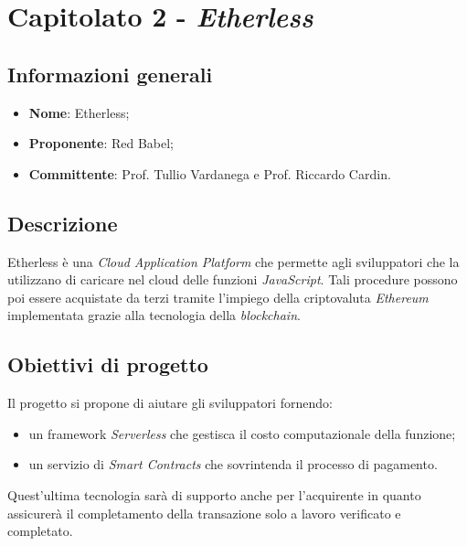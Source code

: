 \section{Capitolato 2 - \textit{Etherless}}
\subsection{Informazioni generali}
    \begin{itemize}
        \item \textbf{Nome}: Etherless;
        \item \textbf{Proponente}: Red Babel;
        \item \textbf{Committente}: Prof. Tullio Vardanega e Prof. Riccardo Cardin.
    \end{itemize}
\subsection{Descrizione}
    Etherless è una \textit{Cloud Application Platform} che permette agli sviluppatori che la utilizzano di caricare nel cloud delle funzioni
    \textit{JavaScript}. Tali procedure possono poi essere acquistate da terzi tramite l'impiego della criptovaluta \textit{Ethereum} implementata
    grazie alla tecnologia della \textit{blockchain}.
\subsection{Obiettivi di progetto}
    Il progetto si propone di aiutare gli sviluppatori fornendo:
    \begin{itemize}
        \item un framework \textit{Serverless} che gestisca il costo computazionale della funzione;
        \item un servizio di \textit{Smart Contracts} che sovrintenda il processo di pagamento.
    \end{itemize}
    Quest'ultima tecnologia sarà di supporto anche per l'acquirente in quanto assicurerà il completamento della transazione solo a lavoro verificato e completato.
